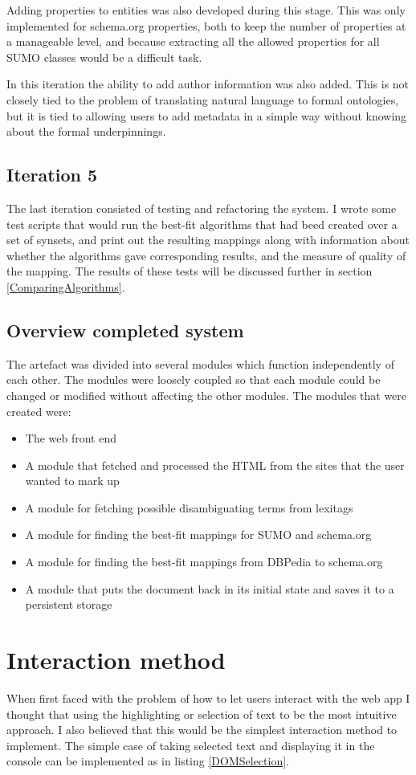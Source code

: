 Adding properties to entities was also developed during this stage.
This was only implemented for schema.org properties,
both to keep the number of properties at a manageable level,
and because extracting all the allowed properties for all SUMO classes would be a difficult task.

In this iteration the ability to add author information was also added.
This is not closely tied to the problem of translating natural language to formal ontologies,
but it is tied to allowing users to add metadata in a simple way without knowing about the formal underpinnings.

\subsection{Iteration 5}
The last iteration consisted of testing and refactoring the system.
I wrote some test scripts that would run the best-fit algorithms that had beed created over a set of synsets,
and print out the resulting mappings along with information about whether the algorithms gave corresponding results,
and the measure of quality of the mapping.
The results of these tests will be discussed further in section \ref{ComparingAlgorithms}.

\subsection{Overview completed system}
The artefact was divided into several modules which function independently of each other.
The modules were loosely coupled so that each module could be changed or modified without affecting the other modules.
The modules that were created were:
\begin{itemize}
	\item The web front end
	\item A module that fetched and processed the HTML from the sites that the user wanted to mark up
	\item A module for fetching possible disambiguating terms from lexitags
	\item A module for finding the best-fit mappings for SUMO and schema.org
	\item A module for finding the best-fit mappings from DBPedia to schema.org
	\item A module that puts the document back in its initial state and saves it to a persistent storage
\end{itemize}

\section{Interaction method}
\label{Interaction}
When first faced with the problem of how to let users interact with the web app I thought that using the highlighting or
selection of text to be the most intuitive approach.
I also believed that this would be the simplest interaction method to implement.
The simple case of taking selected text and displaying it in the console can be implemented as in listing \ref{DOMSelection}.

